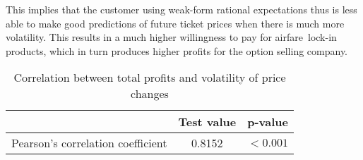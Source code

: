 This implies that the customer using weak-form rational expectations thus is less able to make good predictions of future ticket prices when there is much more volatility. This results in a much higher willingness to pay for airfare~lock-in products, which in turn produces higher profits for the option selling company.


\begin{table}
\centering
\begin{tabular}{l c c}
\toprule
~  &  Test value  &  p-value  \\
\midrule
Pearson's correlation coefficient   &  0.8152  &  $< 0.001$ \\
\bottomrule
\end{tabular}
\caption{Correlation between total profits and volatility of price changes}
\label{tbl:pearson_profitsANDstdchanges}
\end{table}